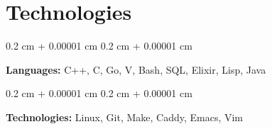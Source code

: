 \documentclass[10pt, letterpaper]{article}
\newenvironment{onecolentry}{
    \begin{adjustwidth}{
        0.2 cm + 0.00001 cm
    }{
        0.2 cm + 0.00001 cm
    }
}{
    \end{adjustwidth}
} %
\begin{document}
    \section{Technologies}




        \begin{onecolentry}
            \textbf{Languages:} C++, C, Go, V, Bash, SQL, Elixir, Lisp, Java
        \end{onecolentry}

        \vspace{0.2 cm}

        \begin{onecolentry}
            \textbf{Technologies:} Linux, Git, Make, Caddy, Emacs, Vim
        \end{onecolentry}
\end{document}
